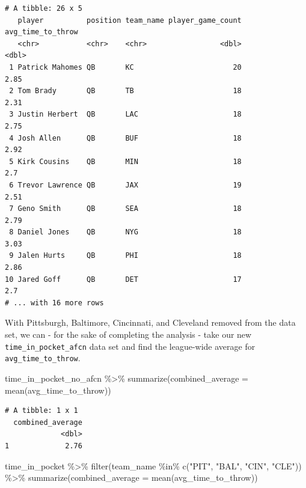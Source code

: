 \documentclass[
  letterpaper,
]{krantz}
\newenvironment{Shaded}{\begin{snugshade}}{\end{snugshade}}
\newcommand{\AttributeTok}[1]{\textcolor[rgb]{0.40,0.45,0.13}{#1}}
\newcommand{\FunctionTok}[1]{\textcolor[rgb]{0.28,0.35,0.67}{#1}}
\newcommand{\NormalTok}[1]{\textcolor[rgb]{0.00,0.23,0.31}{#1}}
\newcommand{\SpecialCharTok}[1]{\textcolor[rgb]{0.37,0.37,0.37}{#1}}
\newcommand{\StringTok}[1]{\textcolor[rgb]{0.13,0.47,0.30}{#1}}
\begin{document}
\begin{verbatim}
# A tibble: 26 x 5
   player          position team_name player_game_count avg_time_to_throw
   <chr>           <chr>    <chr>                 <dbl>             <dbl>
 1 Patrick Mahomes QB       KC                       20              2.85
 2 Tom Brady       QB       TB                       18              2.31
 3 Justin Herbert  QB       LAC                      18              2.75
 4 Josh Allen      QB       BUF                      18              2.92
 5 Kirk Cousins    QB       MIN                      18              2.7 
 6 Trevor Lawrence QB       JAX                      19              2.51
 7 Geno Smith      QB       SEA                      18              2.79
 8 Daniel Jones    QB       NYG                      18              3.03
 9 Jalen Hurts     QB       PHI                      18              2.86
10 Jared Goff      QB       DET                      17              2.7 
# ... with 16 more rows
\end{verbatim}

With Pittsburgh, Baltimore, Cincinnati, and Cleveland removed from the
data set, we can - for the sake of completing the analysis - take our
new \texttt{time\_in\_pocket\_afcn} data set and find the league-wide
average for \texttt{avg\_time\_to\_throw}.

\begin{Shaded}
\begin{Highlighting}[]
\NormalTok{time\_in\_pocket\_no\_afcn }\SpecialCharTok{\%\textgreater{}\%}
  \FunctionTok{summarize}\NormalTok{(}\AttributeTok{combined\_average =} \FunctionTok{mean}\NormalTok{(avg\_time\_to\_throw))}
\end{Highlighting}
\end{Shaded}

\begin{verbatim}
# A tibble: 1 x 1
  combined_average
             <dbl>
1             2.76
\end{verbatim}

\begin{Shaded}
\begin{Highlighting}[]
\NormalTok{time\_in\_pocket }\SpecialCharTok{\%\textgreater{}\%}
  \FunctionTok{filter}\NormalTok{(team\_name }\SpecialCharTok{\%in\%} \FunctionTok{c}\NormalTok{(}\StringTok{"PIT"}\NormalTok{, }\StringTok{"BAL"}\NormalTok{, }\StringTok{"CIN"}\NormalTok{, }\StringTok{"CLE"}\NormalTok{)) }\SpecialCharTok{\%\textgreater{}\%}
  \FunctionTok{summarize}\NormalTok{(}\AttributeTok{combined\_average =} \FunctionTok{mean}\NormalTok{(avg\_time\_to\_throw))}
\end{Highlighting}
\end{Shaded}
\end{document}
